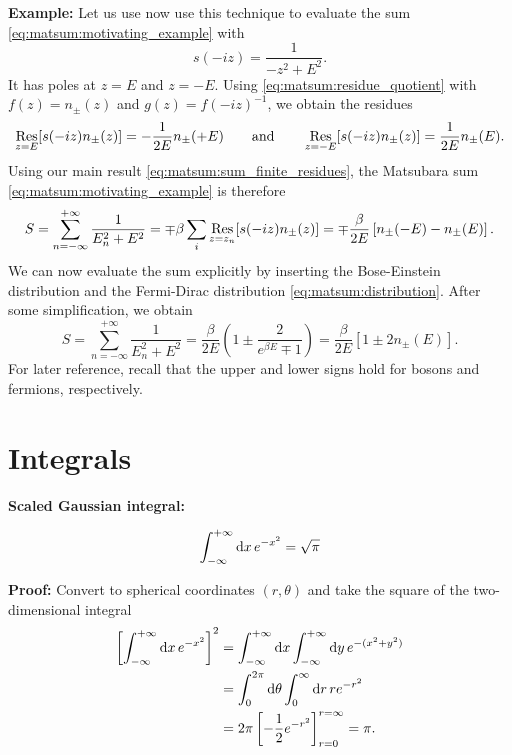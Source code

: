 \textbf{Example:}
Let us use now use this technique to evaluate the sum \eqref{eq:matsum:motivating_example} with
\begin{equation}
	s(-iz) = \frac{1}{-z^2 + E^2} .
\end{equation}
It has poles at $z = E$ and $z = -E$.
Using \cref{eq:matsum:residue_quotient} with $f(z) = n_\pm(z)$ and $g(z) = f(-iz)^{-1}$, we obtain the residues
\begin{equation}
	\operatorname*{Res}_{z =  E}[s(-iz) n_\pm(z)] = -\frac{1}{2 E} n_\pm(+E) 
	\qquad \text{and} \qquad
	\operatorname*{Res}_{z = -E}[s(-iz) n_\pm(z)] =  \frac{1}{2 E} n_\pm( E) .
\end{equation}
Using our main result \eqref{eq:matsum:sum_finite_residues}, the Matsubara sum \eqref{eq:matsum:motivating_example} is therefore
\begin{equation}
	S = \sum_{n=-\infty}^{+\infty} \frac{1}{E_n^2 + E^2}
	  = \mp \beta \sum_i \operatorname*{Res}_{z=z_n}[s(-i z) n_\pm(z)]
	  = \mp \frac{\beta}{2 E} \left[ n_\pm(-E) - n_\pm(E) \right] .
\end{equation}
We can now evaluate the sum explicitly by inserting the Bose-Einstein distribution and the Fermi-Dirac distribution \eqref{eq:matsum:distribution}.
After some simplification, we obtain
\begin{equation}
	S = \sum_{n=-\infty}^{+\infty} \frac{1}{E_n^2 + E^2}
	  = \frac{\beta}{2 E} \left( 1 \pm \frac{2}{e^{\beta E} \mp 1} \right)
	  = \frac{\beta}{2 E} \left[ 1 \pm 2 n_\pm(E) \right] .
\label{eq:matsum:example_result}
\end{equation}
For later reference, recall that the upper and lower signs hold for bosons and fermions, respectively.

\chapter{Integrals}

\newcommand\formulawithcomment[4]{%
\textbf{#1:}
#2
\textbf{#3:} #4
}

\newcommand\formulawithproof[3]{\formulawithcomment{#1}{#2}{Proof}{#3}}
\newcommand\formulawithreference[3]{\formulawithcomment{#1}{#2}{Reference}{#3}}

\formulawithproof{Scaled Gaussian integral}{
	\begin{equation}
		\int_{-\infty}^{+\infty} \mathop{}\!\mathrm{d} x \, e^{-x^2} = \sqrt{\pi}
	\label{eq:integrals:gaussian_sqrtpi}
	\end{equation}
}{
	Convert to spherical coordinates $(r, \theta)$ and take the square of the two-dimensional integral
	\begin{equation*}
	\begin{split}
			\left[ \int_{-\infty}^{+\infty} \mathop{}\!\mathrm{d} x \, e^{-x^2} \right]^2 &= \int_{-\infty}^{+\infty} \mathop{}\!\mathrm{d} x \int_{-\infty}^{+\infty} \mathop{}\!\mathrm{d} y \, e^{-(x^2 + y^2)} \\
		                                                             &= \int_{0}^{2 \pi} \mathop{}\!\mathrm{d} \theta \int_{0}^{\infty} \mathop{}\!\mathrm{d} r \, r e^{-r^2} \\
																	 &= 2 \pi \left[ -\frac12 e^{-r^2} \right]_{r=0}^{r=\infty} = \pi . \\
	\end{split}
	\end{equation*}
}

